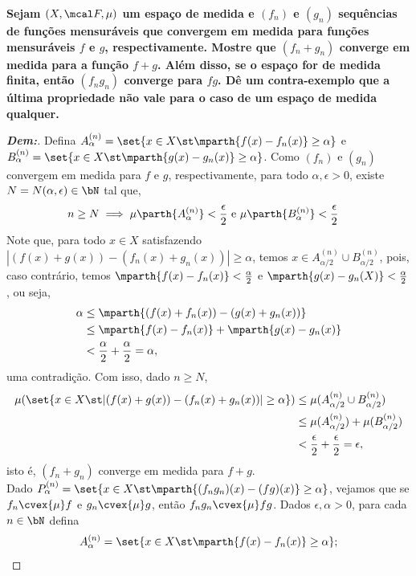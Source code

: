 \textbf{Sejam $(X, \mcal F, \mu)$ um espaço de medida e $(f_n)$ e $(g_n)$ 
sequências de funções mensuráveis que convergem em medida para funções mensuráveis 
$f$ e $g$, respectivamente. Mostre que $(f_n + g_n)$ converge em medida para a função 
$f+g$. Além disso, se o espaço for de medida finita, então $(f_ng_n)$ converge para $fg$. 
Dê um contra-exemplo que a última propriedade não vale para o caso de um espaço de medida 
qualquer.}
\begin{proof}[\textbf{Dem:}] Defina 
  $A_\alpha^{(n)} = \set{x \in X \st \mparth{f(x) - f_n(x)} \ge \alpha}$
e 
  $B_\alpha^{(n)} = \set{x \in X \st \mparth{g(x) - g_n(x)} \ge \alpha}$.
Como $(f_n)$ e $(g_n)$ convergem em medida para $f$ e $g$,
respectivamente, para todo $\alpha, \epsilon>0$, existe $N = N(\alpha, \epsilon) \in \bN$
tal que,
\begin{align*}
n \ge N &\implies \mu\parth{A_\alpha^{(n)}}<\frac{\epsilon}{2} \text{ e }
\mu\parth{B_\alpha^{(n)}}< \frac{\epsilon}{2}
\end{align*}
Note que, para todo $x \in X$ satisfazendo $|(f(x) + g(x)) - (f_n(x) + g_n(x))| \ge \alpha$,
  temos $x \in A_{\alpha/2}^{(n)}\cup B_{\alpha/2}^{(n)}$, pois, caso contrário, temos 
$\mparth{f(x) - f_n(x)} < \frac{\alpha}{2}$ e $\mparth{g(x) - g_n(X)} <\frac{\alpha}{2}$,
ou seja,
\begin{align*}
  \alpha &\le \mparth{(f(x) + f_n(x)) - (g(x) + g_n(x))} \\
  &\le \mparth{f(x) - f_n(x)}
  + \mparth{g(x) - g_n(x)}\\
  &< \frac{\alpha}{2}+ \frac{\alpha}{2} = \alpha,
\end{align*}
uma contradição. Com isso, dado $n \ge N$,
\begin{align*}
  \mu(\set{x \in X \st |(f(x) + g(x)) - (f_n(x) + g_n(x))| \ge \alpha})
  &\le \mu(A_{\alpha/2}^{(n)} \cup B_{\alpha/2}^{(n)})\\
  &\le \mu(A_{\alpha/2}^{(n)}) + \mu(B_{\alpha/2}^{(n)})\\
  &< \frac{\epsilon}{2} + \frac{\epsilon}{2} = \epsilon,
\end{align*}
isto é, $(f_n + g_n)$ converge em medida para $f+g$.\\
  Dado $P_\alpha^{(n)} = \set{x \in X \st \mparth{(f_n g_n)(x) - (fg)(x)} \ge \alpha}$,
  vejamos que se $f_n \cvex{\mu} f$ e $g_n \cvex{\mu} g$, então $f_ng_n \cvex{\mu} fg$.
  Dados $\epsilon, \alpha> 0$, para cada $n \in \bN$ 
  defina
  \begin{align*}
    A_\alpha^{(n)} &= \set{x \in X \st \mparth{f(x) - f_n(x)} \ge \alpha};\\

\end{align*}
\end{proof}
